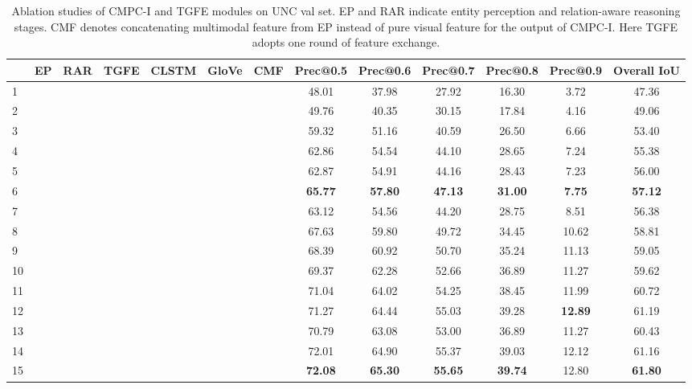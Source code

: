 \documentclass[10pt,journal,cspaper,compsoc]{IEEEtran}
\begin{document}
\begin{table*}[t]
  \centering
  \begin{tabular}{|l|cccccc|ccccc|c|}
      \hline
      & EP & RAR & TGFE & CLSTM & GloVe & CMF & Prec@0.5 & Prec@0.6 & Prec@0.7 & Prec@0.8  & Prec@0.9  & Overall IoU \\
      \hline
      1 & & & & & & & 48.01 & 37.98 & 27.92 & 16.30 & 3.72 & 47.36 \\
      2 &  & & &  & & & 49.76 & 40.35 & 30.15 & 17.84 & 4.16 & 49.06 \\
      3 & &  & & &  & & 59.32 & 51.16 & 40.59 & 26.50 & 6.66 & 53.40 \\
      4 &  &  & & & & & 62.86 & 54.54 & 44.10 & 28.65 & 7.24 & 55.38 \\
      5 &  &  & & &  & & 62.87 & 54.91 & 44.16 & 28.43 & 7.23 & 56.00 \\
      6 &  &  & & &  &  & \textbf{65.77} & \textbf{57.80} & \textbf{47.13} & \textbf{31.00} & \textbf{7.75} & \textbf{57.12} \\
      \hline
      7 & & & &  & &  & 63.12 & 54.56 & 44.20 & 28.75 & 8.51 & 56.38 \\
      8 & & &  &  & & & 67.63 & 59.80 & 49.72 & 34.45 & 10.62 & 58.81 \\
      9 &  & &  &  & & & 68.39 & 60.92 & 50.70 & 35.24 & 11.13 & 59.05 \\
      10 & &  &  &  & & & 69.37 & 62.28 & 52.66 & 36.89 & 11.27 & 59.62 \\
      11 &  &  &  &  & & & 71.04 & 64.02 & 54.25 & 38.45 & 11.99 & 60.72 \\
      12 &  &  &  &  &  & & 71.27 & 64.44 & 55.03 & 39.28 & \textbf{12.89} & 61.19 \\
     13 &  &  & &  &   &  & 70.79 & 63.08 & 53.00 & 36.89 & 11.27 & 60.43 \\
      14 &  &  &  & &  &  & 72.01 & 64.90 & 55.37 & 39.03 & 12.12 & 61.16 \\
      15 &  &  &  &  &  &  & \textbf{72.08} & \textbf{65.30} & \textbf{55.65} & \textbf{39.74} & 12.80 & \textbf{61.80} \\
      \hline
  \end{tabular}
  \caption{Ablation studies of CMPC-I and TGFE modules on UNC val set.
  EP and RAR indicate entity perception and relation-aware reasoning stages. CMF denotes concatenating multimodal feature from EP instead of pure visual feature for the output of CMPC-I. Here TGFE adopts one round of feature exchange.}
  \label{tab:cmpc_i}
\end{table*}
\end{document}
